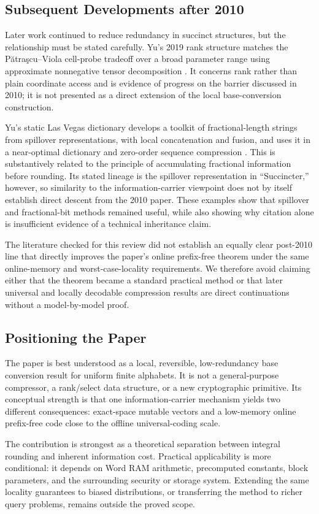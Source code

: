 \subsection{Subsequent Developments after 2010}

Later work continued to reduce redundancy in succinct structures, but the
relationship must be stated carefully.  Yu's 2019 rank structure matches the
P\u{a}tra\c{s}cu--Viola cell-probe tradeoff over a broad parameter range using
approximate nonnegative tensor decomposition \cite{yu2019rank}.  It concerns
rank rather than plain coordinate access and is evidence of progress on the
barrier discussed in 2010; it is not presented as a direct extension of the
local base-conversion construction.

Yu's static Las Vegas dictionary develops a toolkit of fractional-length
strings from spillover representations, with local concatenation and fusion,
and uses it in a near-optimal dictionary and zero-order sequence compression
\cite{yu2022dictionary}.  This is substantively related to the principle of
accumulating fractional information before rounding.  Its stated lineage is
the spillover representation in ``Succincter,'' however, so similarity to the
information-carrier viewpoint does not by itself establish direct descent
from the 2010 paper.  These examples show that spillover and fractional-bit
methods remained useful, while also showing why citation alone is
insufficient evidence of a technical inheritance claim.

The literature checked for this review did not establish an equally clear
post-2010 line that directly improves the paper's online prefix-free theorem
under the same online-memory and worst-case-locality requirements.  We
therefore avoid claiming either that the theorem became a standard practical
method or that later universal and locally decodable compression results are
direct continuations without a model-by-model proof.

\subsection{Positioning the Paper}

The paper is best understood as a local, reversible, low-redundancy base
conversion result for uniform finite alphabets.  It is not a general-purpose
compressor, a rank/select data structure, or a new cryptographic primitive.
Its conceptual strength is that one information-carrier mechanism yields two
different consequences: exact-space mutable vectors and a low-memory online
prefix-free code close to the offline universal-coding scale.

The contribution is strongest as a theoretical separation between integral
rounding and inherent information cost.  Practical applicability is more
conditional: it depends on Word RAM arithmetic, precomputed constants,
block parameters, and the surrounding security or storage system.  Extending
the same locality guarantees to biased distributions, or transferring the
method to richer query problems, remains outside the proved scope.
